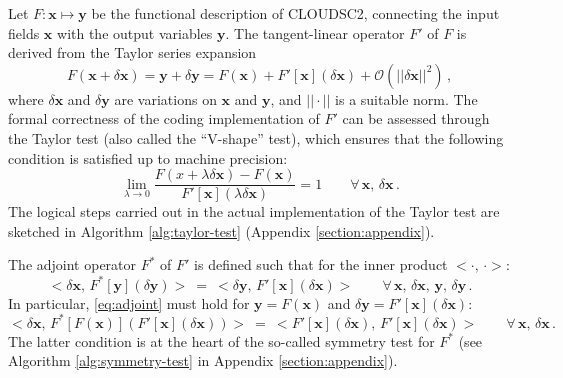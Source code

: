 \documentclass[main.tex]{subfiles}
\begin{document}
        Let $F: \boldsymbol{x} \mapsto \boldsymbol{y}$ be the functional description of CLOUDSC2, connecting the input fields $\boldsymbol{x}$ with the output variables $\boldsymbol{y}$. The tangent-linear operator $F'$ of $F$ is derived from the Taylor series expansion
        \begin{equation}
            F \left( \boldsymbol{x} + \delta \boldsymbol{x} \right) = \boldsymbol{y} + \delta \boldsymbol{y} = F \left( \boldsymbol{x} \right) + F' \left[ \boldsymbol{x} \right] \left( \delta \boldsymbol{x} \right) + \mathcal{O} \left( ||\delta \boldsymbol{x} ||^2 \right) \, ,
        \end{equation}
        where $\delta \boldsymbol{x}$ and $\delta \boldsymbol{y}$ are variations on $\boldsymbol{x}$ and $\boldsymbol{y}$, and $|| \cdot ||$ is a suitable norm. The formal correctness of the coding implementation of $F'$ can be assessed through the Taylor test (also called the ``V-shape'' test), which ensures that the following condition is satisfied up to machine precision:
        \begin{equation}
            \lim_{\lambda \to 0} \dfrac{F \left( x + \lambda \delta \boldsymbol{x} \right) - F \left( \boldsymbol{x} \right)}{F' \left[ \boldsymbol{x} \right] \left( \lambda \delta \boldsymbol{x} \right)} = 1 \qquad \forall \, \boldsymbol{x}, \, \delta \boldsymbol{x} \, .
        \end{equation}
        The logical steps carried out in the actual implementation of the Taylor test are sketched in Algorithm \ref{alg:taylor-test} (Appendix \ref{section:appendix}).

        The adjoint operator $F^*$ of $F'$ is defined such that for the inner product $< \cdot, \, \cdot >$:
        \begin{equation}
            \label{eq:adjoint}
            < \delta \boldsymbol{x}, \, F^* \left[ \boldsymbol{y} \right] \left( \delta \boldsymbol{y} \right) > ~ = ~ < \delta \boldsymbol{y}, \, F' \left[ \boldsymbol{x} \right] \left( \delta \boldsymbol{x} \right) > \qquad \forall \, \boldsymbol{x}, \, \delta \boldsymbol{x}, \, \boldsymbol{y}, \, \delta \boldsymbol{y} \, .
        \end{equation}
        In particular, \eqref{eq:adjoint} must hold for $\boldsymbol{y} = F \left( \boldsymbol{x} \right)$ and $\delta \boldsymbol{y} = F' \left[ \boldsymbol{x} \right] \left( \delta \boldsymbol{x} \right)$:
        \begin{equation}
            \label{eq:symmetry-test}
            < \delta \boldsymbol{x}, \, F^* \left[ F \left( \boldsymbol{x} \right) \right] \left( F' \left[ \boldsymbol{x} \right] \left( \delta \boldsymbol{x} \right) \right) > ~ = ~ < F' \left[ \boldsymbol{x} \right] \left( \delta \boldsymbol{x} \right), \, F' \left[ \boldsymbol{x} \right] \left( \delta \boldsymbol{x} \right) > \qquad \forall \, \boldsymbol{x}, \, \delta \boldsymbol{x} \, .
        \end{equation}
        The latter condition is at the heart of the so-called symmetry test for $F^*$ (see Algorithm \ref{alg:symmetry-test} in Appendix \ref{section:appendix}).

\end{document}
